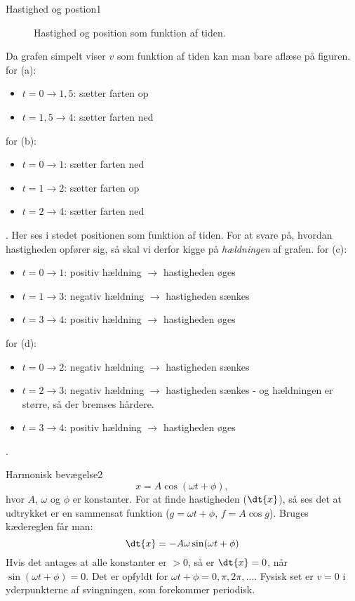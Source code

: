 \begin{opgave}{Hastighed og postion}{1}
\begin{figure}[h!]
  \centering
  \caption{Hastighed og position som funktion af tiden.}
  \label{fig:vx_grafer}
\end{figure}
\opg Da grafen simpelt viser $v$ som funktion af tiden kan man bare aflæse på figuren.
for (a): 
\begin{itemize}
\item $t= 0 \rightarrow 1,5$: sætter farten op
\item $t= 1,5 \rightarrow 4$: sætter farten ned
\end{itemize}
for (b):
\begin{itemize}
\item $t= 0 \rightarrow 1$: sætter farten ned
\item $t= 1 \rightarrow 2$: sætter farten op
\item $t= 2 \rightarrow 4$: sætter farten ned
\end{itemize}
.
\opg Her ses i stedet positionen som funktion af tiden. For at svare på, hvordan hastigheden opfører sig, så skal vi derfor kigge på \emph{hældningen} af grafen.
for (c): 
\begin{itemize}
\item $t= 0 \rightarrow 1$: positiv hældning $\rightarrow$ hastigheden øges
\item $t= 1 \rightarrow 3$: negativ hældning $\rightarrow$ hastigheden sænkes
\item $t= 3 \rightarrow 4$: positiv hældning $\rightarrow$ hastigheden øges
\end{itemize}
for (d):
\begin{itemize}
\item $t= 0 \rightarrow 2$: negativ hældning $\rightarrow$ hastigheden sænkes
\item $t= 2 \rightarrow 3$: negativ hældning $\rightarrow$ hastigheden sænkes - og hældningen er større, så der bremses hårdere.
\item $t= 3 \rightarrow 4$: positiv hældning $\rightarrow$ hastigheden øges
\end{itemize}
.
\end{opgave}
\begin{opgave}{Harmonisk bevægelse}{2}
\begin{equation*}
x = A \cos (\omega t + \phi),
\end{equation*}
hvor $A$, $\omega$ og $\phi$ er konstanter. 
\opg For at finde hastigheden ($\dt{x}$), så ses det at udtrykket er en sammensat funktion ($g=\omega t+\phi$, $f=A\cos g$). Bruges kædereglen får man:
\begin{equation*}
\dt{x} = - A\omega \sin(\omega t + \phi)
\end{equation*}
\opg Hvis det antages at alle konstanter er $>0$, så er $\dt{x}=0$, når $\sin(\omega t + \phi) = 0$. Det er opfyldt for $\omega t + \phi = 0, \pi, 2\pi, ...$. Fysisk set er $v=0$ i yderpunkterne af svingningen, som forekommer periodisk.
\end{opgave}
